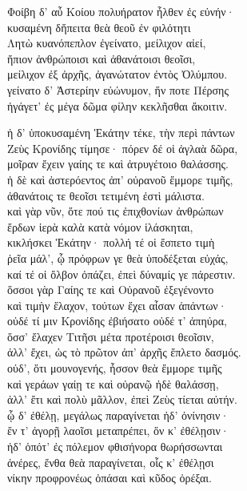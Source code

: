 \quad{}Φοίβη δ' αὖ Κοίου πολυήρατον ἦλθεν ἐς εὐνήν· \\
κυσαμένη δἤπειτα θεὰ θεοῦ ἐν φιλότητι  \\
Λητὼ κυανόπεπλον ἐγείνατο, μείλιχον αἰεί,\\
ἤπιον ἀνθρώποισι καὶ ἀθανάτοισι θεοῖσι, \\
μείλιχον ἐξ ἀρχῆς, ἀγανώτατον ἐντὸς Ὀλύμπου.\\
γείνατο δ' Ἀστερίην εὐώνυμον, ἥν ποτε Πέρσης\\
ἠγάγετ' ἐς μέγα δῶμα φίλην κεκλῆσθαι ἄκοιτιν. 

\quad{}ἡ δ' ὑποκυσαμένη Ἑκάτην τέκε, τὴν περὶ πάντων \\
Ζεὺς Κρονίδης τίμησε· πόρεν δέ οἱ ἀγλαὰ δῶρα, \\
μοῖραν ἔχειν γαίης τε καὶ ἀτρυγέτοιο θαλάσσης.\\
ἡ δὲ καὶ ἀστερόεντος ἀπ' οὐρανοῦ ἔμμορε τιμῆς, \\
ἀθανάτοις τε θεοῖσι τετιμένη ἐστὶ μάλιστα. \\
καὶ γὰρ νῦν, ὅτε πού τις ἐπιχθονίων ἀνθρώπων\\
ἔρδων ἱερὰ καλὰ κατὰ νόμον ἱλάσκηται,\\
κικλήσκει Ἑκάτην· πολλή τέ οἱ ἔσπετο τιμὴ \\
ῥεῖα μάλ', ᾧ πρόφρων γε θεὰ ὑποδέξεται εὐχάς,\\
καί τέ οἱ ὄλβον ὀπάζει, ἐπεὶ δύναμίς γε πάρεστιν. \\
ὅσσοι γὰρ Γαίης τε καὶ Οὐρανοῦ ἐξεγένοντο\\
καὶ τιμὴν ἔλαχον, τούτων ἔχει αἶσαν ἁπάντων· \\
οὐδέ τί μιν Κρονίδης ἐβιήσατο οὐδέ τ' ἀπηύρα,\\
ὅσσ' ἔλαχεν Τιτῆσι μέτα προτέροισι θεοῖσιν, \\
ἀλλ' ἔχει, ὡς τὸ πρῶτον ἀπ' ἀρχῆς ἔπλετο δασμός.  \\
οὐδ', ὅτι μουνογενής, ἧσσον θεὰ ἔμμορε τιμῆς \\
καὶ γεράων γαίῃ τε καὶ οὐρανῷ ἠδὲ θαλάσσῃ, \\
ἀλλ' ἔτι καὶ πολὺ μᾶλλον, ἐπεὶ Ζεὺς τίεται αὐτήν.\\
ᾧ δ' ἐθέλῃ, μεγάλως παραγίνεται ἠδ' ὀνίνησιν· \\
ἔν τ' ἀγορῇ λαοῖσι μεταπρέπει, ὅν κ' ἐθέλῃσιν·  \\
ἠδ' ὁπότ' ἐς πόλεμον φθισήνορα θωρήσσωνται\\
ἀνέρες, ἔνθα θεὰ παραγίνεται, οἷς κ' ἐθέλῃσι\\
νίκην προφρονέως ὀπάσαι καὶ κῦδος ὀρέξαι.\\
